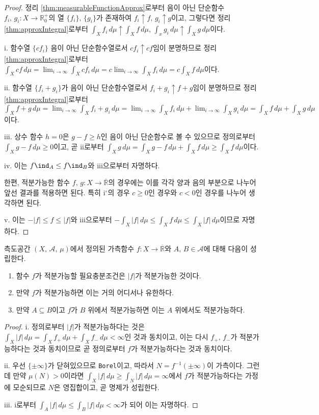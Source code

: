 \begin{proof}
    정리 \ref{thm:measurableFunctionApprox}로부터 음이 아닌 단순함수 $f_i,\,g_i:X\to\mathbb{R}^+_0$의 열 $\{f_i\},\,\{g_i\}$가 존재하여 $f_i\uparrow f,\,g_i\uparrow g$이고, 그렇다면 정리 \ref{thm:approxIntegral}로부터 $\int_Xf_i\,d\mu\uparrow\int_Xf\,d\mu,\,\int_xg_i\,d\mu\uparrow\int_Xg\,d\mu$이다.

    i. 함수열 $\{cf_i\}$ 음이 아닌 단순함수열로서 $cf_i\uparrow cf$임이 분명하므로 정리 \ref{thm:approxIntegral}로부터 $\int_Xcf\,d\mu=\lim_{i\to\infty}\int_Xcf_i\,d\mu=c\lim_{i\to\infty}\int_Xf_i\,d\mu=c\int_Xf\,d\mu$이다.

    ii. 함수열 $\{f_i+g_i\}$가 음이 아닌 단순함수열로서 $f_i+g_i\uparrow f+g$임이 분명하므로 정리 \ref{thm:approxIntegral}로부터 $\int_Xf+g\,d\mu=\lim_{i\to\infty}\int_Xf_i+g_i\,d\mu=\lim_{i\to\infty}\int_Xf_i\,d\mu+\lim_{i\to\infty}\int_Xg_i\,d\mu=\int_Xf\,d\mu+\int_Xg\,d\mu$이다.

    iii. 상수 함수 $h=0$은 $g-f\geq h$인 음이 아닌 단순함수로 볼 수 있으므로 정의로부터 $\int_Xg-f\,d\mu\geq0$이고, 곧 ii로부터 $\int_Xg\,d\mu=\int_Xg-f\,d\mu+\int_Xf\,d\mu\geq\int_Xf\,d\mu$이다.

    iv. 이는 $f\ind_A\leq f\ind_B$와 iii으로부터 자명하다.

    한편, 적분가능한 함수 $f,\,g:X\to\overline{\mathbb{R}}$의 경우에는 이를 각각 양과 음의 부분으로 나누어 앞선 결과를 적용하면 된다. 특히 i$^\circ$의 경우 $c\geq0$인 경우와 $c<0$인 경우를 나누어 생각하면 된다.

    v. 이는 $-|f|\leq f\leq|f|$와 iii으로부터 $-\int_X|f|\,d\mu\leq\int_Xf\,d\mu\leq\int_X|f|\,d\mu$이므로 자명하다.
\end{proof}

\begin{theorem}\label{thm:integralFinite}
    측도공간 $(X,\,\mathcal{A},\,\mu)$에서 정의된 가측함수 $f:X\to\overline{\mathbb{R}}$와 $A,\,B\in\mathcal{A}$에 대해 다음이 성립한다.
    \begin{enumerate}
        \item 함수 $f$가 적분가능할 필요충분조건은 $|f|$가 적분가능한 것이다.
        \item 만약 $f$가 적분가능하면 이는 거의 어디서나 유한하다.
        \item 만약 $A\subseteq B$이고 $f$가 $B$ 위에서 적분가능하면 이는 $A$ 위에서도 적분가능하다.
    \end{enumerate}
\end{theorem}

\begin{proof}
    i. 정의로부터 $|f|$가 적분가능하다는 것은 $\int_X|f|\,d\mu=\int_Xf_+\,d\mu+\int_Xf_-\,d\mu<\infty$인 것과 동치이고, 이는 다시 $f_+,\,f_-$가 적분가능하다는 것과 동치이므로 곧 정의로부터 $f$가 적분가능하다는 것과 동치이다.

    ii. 우선 $\{\pm\infty\}$가 닫혀있으므로 \texttt{Borel}이고, 따라서 $N=f^{-1}(\pm\infty)$이 가측이다. 그런데 만약 $\mu(N)>0$이라면 $\int_X|f|\,d\mu\geq\int_N|f|\,d\mu=\infty$에서 $f$가 적분가능하다는 가정에 모순되므로 $N$은 영집합이고, 곧 명제가 성립한다.

    iii. i로부터 $\int_A|f|\,d\mu\leq\int_B|f|\,d\mu<\infty$가 되어 이는 자명하다.
\end{proof}


